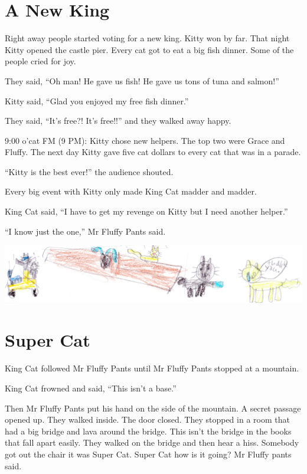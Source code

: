 \documentclass[12pt,oneside]{krantz}
\begin{document}
\hypertarget{a-new-king}{%
\chapter{A New King}\label{a-new-king}}

Right away people started voting for a new king. Kitty won by far. That
night Kitty opened the castle pier. Every cat got to eat a big fish
dinner. Some of the people cried for joy.

They said, ``Oh man! He gave us fish! He gave us tons of tuna and
salmon!''

Kitty said, ``Glad you enjoyed my free fish dinner.''

They said, ``It's free?! It's free!!'' and they walked away happy.

9:00 o'cat FM (9 PM): Kitty chose new helpers. The top two were Grace
and Fluffy. The next day Kitty gave five cat dollars to every cat that
was in a parade.

``Kitty is the best ever!'' the audience shouted.

Every big event with Kitty only made King Cat madder and madder.

King Cat said, ``I have to get my revenge on Kitty but I need another
helper.''

``I know just the one,'' Mr Fluffy Pants said.

\includegraphics{img/thankyou.jpg}

\hypertarget{super-cat}{%
\chapter{Super Cat}\label{super-cat}}

King Cat followed Mr Fluffy Pants until Mr Fluffy Pants stopped at a
mountain.

King Cat frowned and said, ``This isn't a base.''

Then Mr Fluffy Pants put his hand on the side of the mountain. A secret
passage opened up. They walked inside. The door closed. They stopped in
a room that had a big bridge and lava around the bridge. This isn't the
bridge in the books that fall apart easily. They walked on the bridge
and then hear a hiss. Somebody got out the chair it was Super Cat. Super
Cat how is it going? Mr Fluffy pants said.
\end{document}
